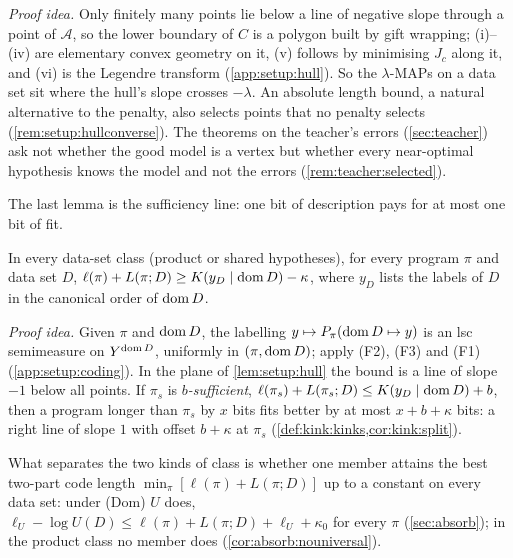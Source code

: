\emph{Proof idea.} Only finitely many points lie below a line of negative slope through a point of $\mathcal A$, so the lower boundary of $C$ is a polygon built by gift wrapping; (i)--(iv) are elementary convex geometry on it, (v) follows by minimising $J_c$ along it, and (vi) is the Legendre transform (\cref{app:setup:hull}). So the $\lambda$-MAPs on a data set sit where the hull's slope crosses $-\lambda$. An absolute length bound, a natural alternative to the penalty, also selects points that no penalty selects (\cref{rem:setup:hullconverse}). The theorems on the teacher's errors (\cref{sec:teacher}) ask not whether the good model is a vertex but whether every near-optimal hypothesis knows the model and not the errors (\cref{rem:teacher:selected}).

The last lemma is the sufficiency line: one bit of description pays for at most one bit of fit.

\begin{lemma}\label{lem:setup:coding}
In every data-set class (product or shared hypotheses), for every program $\pi$ and data set $D$, $\ell(\pi)+L(\pi;D)\ge K(y_D\mid\operatorname{dom} D)-\kappa$, where $y_D$ lists the labels of $D$ in the canonical order of $\operatorname{dom} D$.
\end{lemma}

\emph{Proof idea.} Given $\pi$ and $\operatorname{dom} D$, the labelling $y\mapsto P_\pi(\operatorname{dom} D\mapsto y)$ is an lsc semimeasure on $Y^{\operatorname{dom} D}$, uniformly in $(\pi,\operatorname{dom} D)$; apply (F2), (F3) and (F1) (\cref{app:setup:coding}). In the plane of \cref{lem:setup:hull} the bound is a line of slope $-1$ below all points. If $\pi_s$ is \emph{$b$-sufficient}, $\ell(\pi_s)+L(\pi_s;D)\le K(y_D\mid\operatorname{dom} D)+b$, then a program longer than $\pi_s$ by $x$ bits fits better by at most $x+b+\kappa$ bits: a right line of slope $1$ with offset $b+\kappa$ at $\pi_s$ (\cref{def:kink:kinks,cor:kink:split}).

What separates the two kinds of class is whether one member attains the best two-part code length $\min_\pi[\ell(\pi)+L(\pi;D)]$ up to a constant on every data set: under (Dom) $U$ does, $\ell_U-\log U(D)\le\ell(\pi)+L(\pi;D)+\ell_U+\kappa_0$ for every $\pi$ (\cref{sec:absorb}); in the product class no member does (\cref{cor:absorb:nouniversal}).
